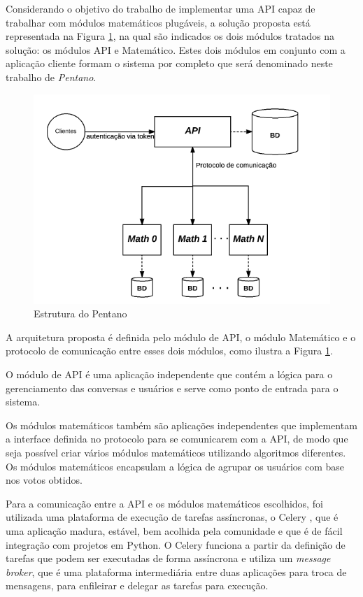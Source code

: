     Considerando o objetivo do trabalho de implementar uma API capaz de trabalhar com 
    módulos matemáticos plugáveis, a solução proposta está representada na Figura \ref{fig:pentano}, 
    na qual são indicados os dois módulos tratados na solução: os módulos API e Matemático. Estes
    dois módulos em conjunto com a aplicação cliente formam o sistema por completo que será denominado neste trabalho
    de \textit{Pentano}.
    
    \begin{figure}[h!]
    \centering
    \includegraphics[scale=0.7]{figuras/esquema_pentano.png}
    \caption{Estrutura do Pentano}
    \label{fig:pentano}
    \end{figure}
    
    A arquitetura proposta é definida pelo módulo de API, o módulo Matemático
    e o protocolo de comunicação entre esses dois módulos, como ilustra a Figura \ref{fig:pentano}.
    
    O módulo de API é uma aplicação independente que contém a lógica para o gerenciamento das conversas e usuários e
    serve como ponto de entrada para o sistema.
    
    Os módulos matemáticos também são aplicações independentes que implementam a interface definida no protocolo
    para se comunicarem com a API, de modo que seja possível criar vários módulos matemáticos utilizando algoritmos diferentes.
    Os módulos matemáticos encapsulam a lógica de agrupar os usuários com base nos votos obtidos.
    
    Para a comunicação entre a API e os módulos matemáticos escolhidos, foi utilizada
    uma plataforma de execução de tarefas assíncronas, o Celery \footnotemark, que é uma aplicação
    madura, estável, bem acolhida pela comunidade e que é de fácil integração com projetos em Python.
    O Celery funciona a partir da definição de tarefas que podem ser executadas de forma assíncrona
    e utiliza um \textit{message broker}, que é uma plataforma intermediária
    entre duas aplicações para troca de mensagens, para enfileirar e delegar as tarefas para execução.
    

